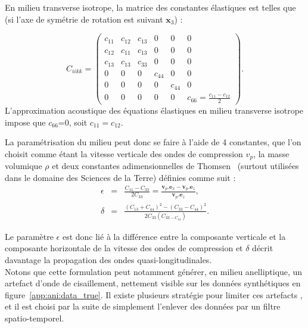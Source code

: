 En milieu transverse isotrope, la matrice des constantes élastiques est telles que (si l'axe de symétrie de rotation est suivant $\bm{x}_{3}$) : 

\begin{equation}
	C_{iikk} = \begin{pmatrix}
		c_{11} & c_{12} & c_{13} & 0 & 0 & 0 \\
		c_{12} & c_{11} & c_{13} & 0 & 0 & 0 \\
		c_{13} & c_{13} & c_{33} & 0 & 0 & 0 \\
		0 & 0 & 0 & c_{44} & 0 & 0 \\
		0 & 0 & 0 & 0 &c_{44} & 0 \\
		0 & 0 & 0 & 0 & 0 & c_{66} = \frac{c_{11}-c_{12}}{2}
	\end{pmatrix}.
\end{equation}
L'approximation acoustique des équations élastiques en milieu transverse isotrope impose que $c_{66}$=0, soit $c_{11}=c_{12}$.
 

La paramétrisation du milieu peut donc se faire à l'aide de 4 constantes, que l'on choisit comme étant la vitesse verticale des ondes de compression $v_{p}$, la masse volumique $\rho$ et deux constantes adimensionnelles de Thomsen~\citep{thomsen} (surtout utilisées dans le domaine des Sciences de la Terre) définies comme suit : 
\begin{eqnarray}
	\epsilon & =  & \frac{C_{11}-C_{33}}{2C_{33}} = \frac{\bm{v}_{p}.\bm{e}_{x} -  \bm{v}_{p}.\bm{e}_{z}}{\bm{v}_{p}.\bm{e}_{z}},\\
	\delta & = & \frac{(C_{13}+C_{44})^2-(C_{33}-C_{44})^2}{2C_{33}(C_{33-C_{44}})}\text{.}
\end{eqnarray}

Le paramètre $\epsilon$ est donc lié à la différence entre la composante verticale et la composante horizontale de la vitesse des ondes de compression et $\delta$ décrit davantage la propagation des ondes quasi-longitudinales.\\

Notons que cette formulation peut notamment générer, en milieu anelliptique, un artefact d'onde de cisaillement, nettement visible sur les données synthétiques en figure~\ref{app:ani:data_true}. Il existe plusieurs stratégie pour limiter ces artefacts \citep{duveneck}, et il est choisi par la suite de simplement l'enlever des données par un filtre spatio-temporel.\\






